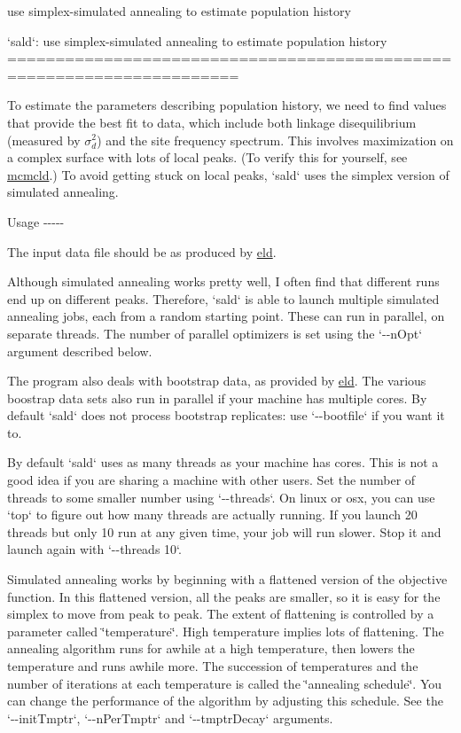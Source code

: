 use simplex-\/simulated annealing to estimate population history

`sald`\-: use simplex-\/simulated annealing to estimate population history ======================================================================

\-To estimate the parameters describing population history, we need to find values that provide the best fit to data, which include both linkage disequilibrium (measured by $\sigma_d^2$) and the site frequency spectrum. \-This involves maximization on a complex surface with lots of local peaks. (\-To verify this for yourself, see \hyperlink{mcmcld}{mcmcld}.) \-To avoid getting stuck on local peaks, `sald` uses the simplex version of simulated annealing.

\-Usage -\/-\/-\/-\/-\/

\-The input data file should be as produced by \hyperlink{eld}{eld}.

\-Although simulated annealing works pretty well, \-I often find that different runs end up on different peaks. \-Therefore, `sald` is able to launch multiple simulated annealing jobs, each from a random starting point. \-These can run in parallel, on separate threads. \-The number of parallel optimizers is set using the `-\/-\/n\-Opt` argument described below.

\-The program also deals with bootstrap data, as provided by \hyperlink{eld}{eld}. \-The various boostrap data sets also run in parallel if your machine has multiple cores. \-By default `sald` does not process bootstrap replicates\-: use `-\/-\/bootfile` if you want it to.

\-By default `sald` uses as many threads as your machine has cores. \-This is not a good idea if you are sharing a machine with other users. \-Set the number of threads to some smaller number using `-\/-\/threads`. \-On linux or osx, you can use `top` to figure out how many threads are actually running. \-If you launch 20 threads but only 10 run at any given time, your job will run slower. \-Stop it and launch again with `-\/-\/threads 10`.

\-Simulated annealing works by beginning with a flattened version of the objective function. \-In this flattened version, all the peaks are smaller, so it is easy for the simplex to move from peak to peak. \-The extent of flattening is controlled by a parameter called \char`\"{}temperature\char`\"{}. \-High temperature implies lots of flattening. \-The annealing algorithm runs for awhile at a high temperature, then lowers the temperature and runs awhile more. \-The succession of temperatures and the number of iterations at each temperature is called the \char`\"{}annealing schedule\char`\"{}. \-You can change the performance of the algorithm by adjusting this schedule. \-See the `-\/-\/init\-Tmptr`, `-\/-\/n\-Per\-Tmptr` and `-\/-\/tmptr\-Decay` arguments.

